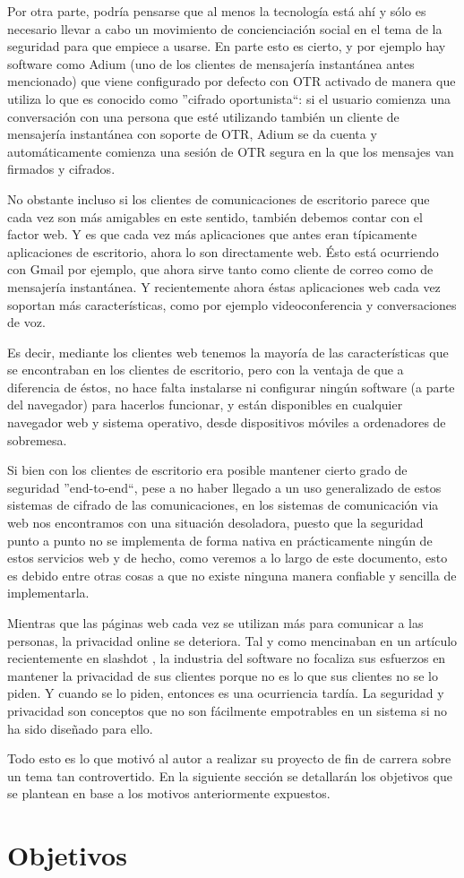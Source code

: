 Por otra parte, podría pensarse que al menos la tecnología está ahí y sólo es necesario llevar a cabo un movimiento de concienciación social en el tema de la seguridad para que empiece a usarse. En parte esto es cierto, y por ejemplo hay software como Adium (uno de los clientes de mensajería instantánea antes mencionado) que viene configurado por defecto con OTR activado de manera que utiliza lo que es conocido como ''cifrado oportunista``: si el usuario comienza una conversación con una persona que esté utilizando también un cliente de mensajería instantánea con soporte de OTR, Adium se da cuenta y automáticamente comienza una sesión de OTR segura en la que los mensajes van firmados y cifrados.

No obstante incluso si los clientes de comunicaciones de escritorio parece que cada vez son más amigables en este sentido, también debemos contar con el factor web. Y es que cada vez más aplicaciones que antes eran típicamente aplicaciones de escritorio, ahora lo son directamente web. Ésto está ocurriendo con Gmail por ejemplo, que ahora sirve tanto como cliente de correo como de mensajería instantánea. Y recientemente ahora éstas aplicaciones web cada vez soportan más características, como por ejemplo videoconferencia y conversaciones de voz. 

Es decir, mediante los clientes web tenemos la mayoría de las características que se encontraban en los clientes de escritorio, pero con la ventaja de que a diferencia de éstos, no hace falta instalarse ni configurar ningún software (a parte del navegador) para hacerlos funcionar, y están disponibles en cualquier navegador web y sistema operativo, desde dispositivos móviles a ordenadores de sobremesa.

Si bien con los clientes de escritorio era posible mantener cierto grado de seguridad ''end-to-end``, pese a no haber llegado a un uso generalizado de estos sistemas de cifrado de las comunicaciones, en los sistemas de comunicación via web nos encontramos con una situación desoladora, puesto que la seguridad punto a punto no se implementa de forma nativa en prácticamente ningún de estos servicios web y de hecho, como veremos a lo largo de este documento, esto es debido entre otras cosas a que no existe ninguna manera confiable y sencilla de implementarla. 

Mientras que las páginas web cada vez se utilizan más para comunicar a las personas, la privacidad online se deteriora. Tal y como mencinaban en un artículo recientemente en slashdot \cite{onlineprivacybroken}, la industria del software no focaliza sus esfuerzos en mantener la privacidad de sus clientes porque no es lo que sus clientes no se lo piden. Y cuando  se lo piden, entonces es una ocurriencia tardía. La seguridad y privacidad son conceptos que no son fácilmente empotrables en un sistema si no ha sido diseñado para ello.

Todo esto es lo que motivó al autor a realizar su proyecto de fin de carrera sobre un tema tan controvertido. En la siguiente sección se detallarán los objetivos que se plantean en base a los motivos anteriormente expuestos.

\section{Objetivos}\label{objetivos}

